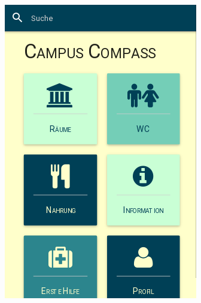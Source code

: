 \begin{figure}[ht]
\begin{minipage}[b]{.5\textwidth}
  \includegraphics[width=.8\linewidth]{img/menu.png}
  \label{img:menu-first-draft}
\end{minipage}
\end{figure}

